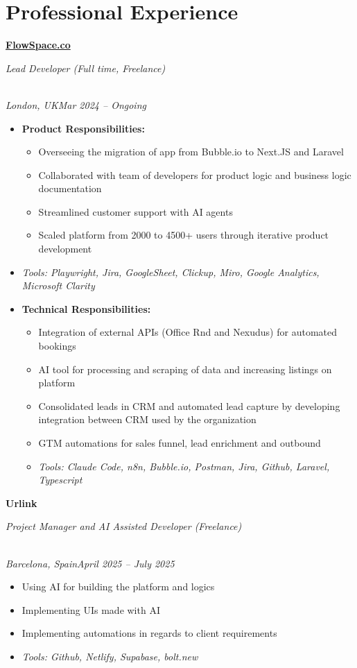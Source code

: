 \documentclass[a4paper,10pt]{article}
\newcommand{\role}[4]{\vspace{3pt}\noindent\hspace{0.6em}\parbox[t]{0.38\textwidth}{\raggedright\textbf{#1}}\hfill\parbox[t]{0.58\textwidth}{\raggedleft\textit{#2}}\\{\textit{#3}\hfill\textit{#4}}\vspace{1pt}}
\begin{document}
\section{Professional Experience}
\role{\href{https://flowspace.co}{FlowSpace.co}}{Lead Developer (Full time, Freelance)}{London, UK}{Mar 2024 -- Ongoing}
\begin{itemize}
\item \textbf{Product Responsibilities:}
\begin{itemize}[label=--]
\item Overseeing the migration of app from Bubble.io to Next.JS and Laravel
\item Collaborated with team of developers for product logic and business logic documentation
\item Streamlined customer support with AI agents
\item Scaled platform from 2000 to 4500+ users through iterative product development
\end{itemize}
\item \textit{Tools: Playwright, Jira, GoogleSheet, Clickup, Miro, Google Analytics, Microsoft Clarity}
\item \textbf{Technical Responsibilities:}
\begin{itemize}[label=--]
\item Integration of external APIs (Office Rnd and Nexudus) for automated bookings
\item AI tool for processing and scraping of data and increasing listings on platform
\item Consolidated leads in CRM and automated lead capture by developing integration between CRM used by the organization
\item GTM automations for sales funnel, lead enrichment and outbound
\item \textit{Tools: Claude Code, n8n, Bubble.io, Postman, Jira, Github, Laravel, Typescript}
\end{itemize}
\end{itemize}

\role{Urlink}{Project Manager and AI Assisted Developer (Freelance)}{Barcelona, Spain}{April 2025 -- July 2025}
\begin{itemize}
\item Using AI for building the platform and logics
\item Implementing UIs made with AI
\item Implementing automations in regards to client requirements
\item \textit{Tools: Github, Netlify, Supabase, bolt.new}
\end{itemize}
\end{document}
